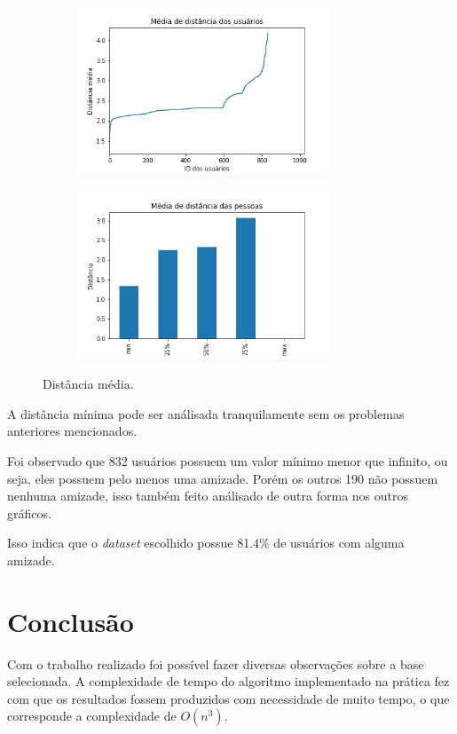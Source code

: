 \documentclass[11pt]{article}
\begin{document}
\begin{center}
\begin{figure}
\begin{subfigure}[b]{.49\linewidth}
\centering
\includegraphics[width=7.5cm]{pmeandist}
\caption{}\label{fig:pmeandist}
\end{subfigure}
\begin{subfigure}[b]{.49\linewidth}
\centering
\includegraphics[width=7.5cm]{meandist}
\caption{}\label{fig:meandist}
\end{subfigure}
\caption{Distância média.}
\end{figure}
\end{center}

A distância mínima pode ser análisada tranquilamente sem os problemas anteriores mencionados.

Foi observado que 832 usuários possuem um valor mínimo menor que infinito, ou seja, eles possuem pelo menos uma amizade. Porém os outros 190 não possuem nenhuma amizade, isso também feito análisado de outra forma nos outros gráficos.

Isso indica que o \emph{dataset} escolhido possue 81.4\% de usuários com alguma amizade.


\section{Conclusão}
\label{sec:org990fc19}

Com o trabalho realizado foi possível fazer diversas observações sobre a base selecionada. A complexidade de tempo do algoritmo implementado na prática fez com que os resultados fossem produzidos com necessidade de muito tempo, o que corresponde a complexidade de \(O(n^3)\).
\end{document}
